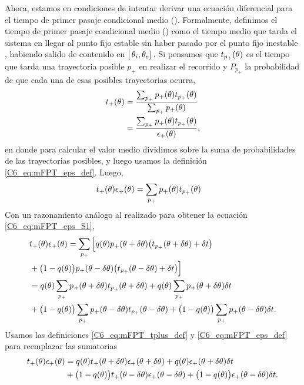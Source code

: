 \documentclass[./main.tex]{subfiles}
\begin{document}
Ahora, estamos en condiciones de intentar derivar una ecuación diferencial para el tiempo de primer pasaje condicional medio \tplus(\xx). Formalmente, definimos el tiempo de primer pasaje condicional medio \tplus(\xx) como el tiempo medio que tarda el sistema en llegar al punto fijo estable \xxe sin haber pasado por el punto fijo inestable \xxi, habiendo salido de \xx contenido en $[ \,\theta_i,\theta_e ]\,$. Si pensamos que $t_{p_{+}}(\theta)$ es el tiempo que tarda una trayectoria posible $p_{+}$ en realizar el recorrido y $P_{p_{+}}$ la probabilidad de que cada una de esas posibles trayectorias ocurra,
\begin{align}
    t_{+}(\theta) &= \frac{\sum_{p_{+}}p_{+}(\theta) t_{p_{+}}(\theta)}{\sum_{p_{+}}p_{+}(\theta)}\\
    & = \frac{\sum_{p_{+}}p_{+}(\theta) t_{p_{+}}(\theta)}{\epsilon_{+}(\theta)},
\end{align}
en donde para calcular el valor medio dividimos sobre la suma de probabilidades de las trayectorias posibles, y luego usamos la definición \ref{C6_eq:mFPT_eps_def}. Luego,
\begin{align}
    t_{+}(\theta) \epsilon_{+}(\theta)  &= \sum_{p_{+}}p_{+}(\theta) t_{p_{+}}(\theta) 
    \label{C6_eq:mFPT_tplus_def}
\end{align}
Con un razonamiento análogo al realizado para obtener la ecuación \ref{C6_eq:mFPT_eps_S1}, 
\begin{align}
   & t_{+}(\theta) \epsilon_{+}(\theta) = \sum_{p_{+}} \Big[ q(\theta)  p_{+}(\theta + \delta\theta ) \big( t_{p_{+}}(\theta + \delta\theta) + \delta t \big)  \nonumber \\ & + \big( 1 - q(\theta) \big)  p_{+}(\theta - \delta\theta ) \big( t_{p_{+}}(\theta - \delta\theta) + \delta t \big)\Big] \\
   & =  q(\theta) \sum_{p_{+}} p_{+}(\theta + \delta\theta ) t_{p_{+}}(\theta + \delta\theta) + q(\theta) \sum_{p_{+}} p_{+}(\theta + \delta\theta ) \delta t  \nonumber \\ & + \big( 1 - q(\theta) \big) \sum_{p_{+}}p_{+}(\theta - \delta\theta ) t_{p_{+}}(\theta - \delta\theta) +  \big( 1 - q(\theta) \big) \sum_{p_{+}}p_{+}(\theta - \delta\theta ) \delta t .
\end{align}
Usamos las definiciones \ref{C6_eq:mFPT_tplus_def} y \ref{C6_eq:mFPT_eps_def} para reemplazar las sumatorias
\begin{align}
   t_{+}(\theta) \epsilon_{+}(\theta) & = q(\theta) t_{+}(\theta + \delta\theta) \epsilon_{+}(\theta + \delta\theta) + q(\theta) \epsilon_{+}(\theta + \delta\theta) \delta t \nonumber \\ & + \big( 1 - q(\theta) \big) t_{+}(\theta - \delta\theta) \epsilon_{+}(\theta - \delta\theta) +  \big( 1 - q(\theta) \big) \epsilon_{+}(\theta - \delta\theta) \delta t.
   \label{C6_eq:mFPT_tplus_S1}
\end{align}
\end{document}
